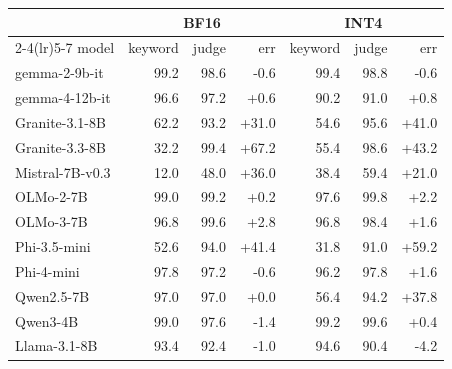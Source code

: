 \begin{tabular}{lrrrrrr}
\toprule
& \multicolumn{3}{c}{BF16} & \multicolumn{3}{c}{INT4} \\
\cmidrule(lr){2-4}\cmidrule(lr){5-7}
model & keyword & judge & err & keyword & judge & err \\
\midrule
gemma-2-9b-it & 99.2 & 98.6 & -0.6 & 99.4 & 98.8 & -0.6 \\
gemma-4-12b-it & 96.6 & 97.2 & +0.6 & 90.2 & 91.0 & +0.8 \\
Granite-3.1-8B & 62.2 & 93.2 & +31.0 & 54.6 & 95.6 & +41.0 \\
Granite-3.3-8B & 32.2 & 99.4 & +67.2 & 55.4 & 98.6 & +43.2 \\
Mistral-7B-v0.3 & 12.0 & 48.0 & +36.0 & 38.4 & 59.4 & +21.0 \\
OLMo-2-7B & 99.0 & 99.2 & +0.2 & 97.6 & 99.8 & +2.2 \\
OLMo-3-7B & 96.8 & 99.6 & +2.8 & 96.8 & 98.4 & +1.6 \\
Phi-3.5-mini & 52.6 & 94.0 & +41.4 & 31.8 & 91.0 & +59.2 \\
Phi-4-mini & 97.8 & 97.2 & -0.6 & 96.2 & 97.8 & +1.6 \\
Qwen2.5-7B & 97.0 & 97.0 & +0.0 & 56.4 & 94.2 & +37.8 \\
Qwen3-4B & 99.0 & 97.6 & -1.4 & 99.2 & 99.6 & +0.4 \\
Llama-3.1-8B & 93.4 & 92.4 & -1.0 & 94.6 & 90.4 & -4.2 \\
\bottomrule
\end{tabular}
